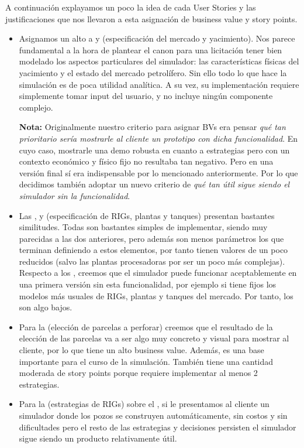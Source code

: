 A continuación explayamos un poco la idea de cada User Stories y las justificaciones que nos llevaron a esta asignación de business value y story points.

\begin{itemize}
  \item Asignamos un alto \BV{} a  y  (especificación del mercado y yacimiento). Nos parece fundamental a la hora de plantear el canon para una licitación tener bien modelado los aspectos particulares del simulador: las características físicas del yacimiento y el estado del mercado petrolífero. Sin ello todo lo que hace la simulación es de poca utilidad analítica. A su vez, su implementación requiere simplemente tomar input del usuario, y no incluye ningún componente complejo.

  \textbf{Nota:} Originalmente nuestro criterio para asignar BVs era pensar \emph{qué tan prioritario sería mostrarle al cliente un prototipo con dicha funcionalidad}. En cuyo caso, mostrarle una demo robusta en cuanto a estrategias pero con un contexto económico y físico fijo no resultaba tan negativo. Pero en una versión final sí era indispensable por lo mencionado anteriormente. Por lo que decidimos también adoptar un nuevo criterio de \emph{qué tan útil sigue siendo el simulador sin la funcionalidad}.

  \item Las ,  y  (especificación de RIGs, plantas y tanques) presentan bastantes similitudes. Todas son bastantes simples de implementar, siendo muy parecidas a las dos anteriores, pero además son menos parámetros los que terminan definiendo a estos elementos, por tanto tienen valores de \SP{} un poco reducidos (salvo  las plantas procesadoras por ser un poco más complejas). Respecto a los \BV{}, creemos que el simulador puede funcionar aceptablemente en una primera versión sin esta funcionalidad, por ejemplo si tiene fijos los modelos más usuales de RIGs, plantas y tanques del mercado. Por tanto, los \BV{} son algo bajos. 

  \item Para la  (elección de parcelas a perforar) creemos que el resultado de la elección de las parcelas va a ser algo muy concreto y visual para mostrar al cliente, por lo que tiene un alto business value. Además, es una base importante para el curso de la simulación. También tiene una cantidad moderada de story points porque requiere implementar al menos 2 estrategias.
  
  \item Para la  (estrategias de RIGs) sobre el \BV{}, si le presentamos al cliente un simulador donde los pozos se construyen automáticamente, sin costos y sin dificultades pero el resto de las estrategias y decisiones persisten el simulador sigue siendo un producto relativamente útil. 


\end{itemize}

